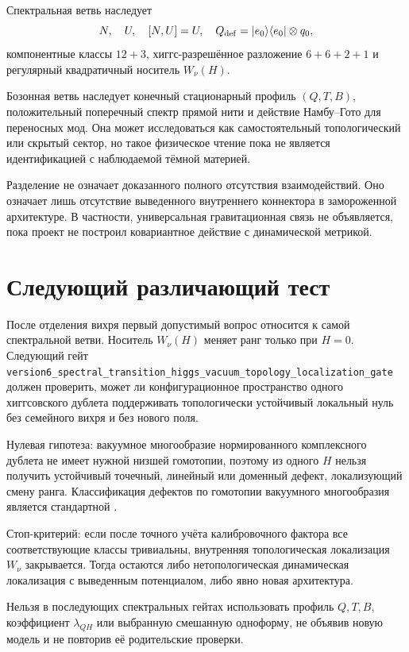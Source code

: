 Спектральная ветвь наследует
\begin{equation}
 N,\quad U,\quad [N,U]=U,\quad
 Q_{\rm def}=|e_0\rangle\langle e_0|\otimes q_0,
\end{equation}
компонентные классы $12+3$, хиггс-разрешённое разложение
$6+6+2+1$ и регулярный квадратичный носитель $W_\nu(H)$.

Бозонная ветвь наследует конечный стационарный профиль $(Q,T,B)$,
положительный поперечный спектр прямой нити и действие Намбу--Гото для
переносных мод. Она может исследоваться как самостоятельный
топологический или скрытый сектор, но такое физическое чтение пока не
является идентификацией с наблюдаемой тёмной материей.

Разделение не означает доказанного полного отсутствия взаимодействий.
Оно означает лишь отсутствие выведенного внутреннего коннектора в
замороженной архитектуре. В частности, универсальная гравитационная
связь не объявляется, пока проект не построил ковариантное действие с
динамической метрикой.

\section{Следующий различающий тест}

После отделения вихря первый допустимый вопрос относится к самой
спектральной ветви. Носитель $W_\nu(H)$ меняет ранг только при $H=0$.
Следующий гейт
\texttt{version6\_spectral\_transition\_higgs\_vacuum\_topology\_localization\_gate}
должен проверить, может ли конфигурационное пространство одного
хиггсовского дублета поддерживать топологически устойчивый локальный нуль
без семейного вихря и без нового поля.

Нулевая гипотеза: вакуумное многообразие нормированного комплексного
дублета не имеет нужной низшей гомотопии, поэтому из одного $H$ нельзя
получить устойчивый точечный, линейный или доменный дефект, локализующий
смену ранга. Классификация дефектов по гомотопии вакуумного многообразия
является стандартной \cite{mermin1979}.

Стоп-критерий: если после точного учёта калибровочного фактора все
соответствующие классы тривиальны, внутренняя топологическая локализация
$W_\nu$ закрывается. Тогда остаются либо нетопологическая динамическая
локализация с выведенным потенциалом, либо явно новая архитектура.

\begin{nogocriterion}
Нельзя в последующих спектральных гейтах использовать профиль $Q,T,B$,
коэффициент $\lambda_{QH}$ или выбранную смешанную одноформу, не объявив
новую модель и не повторив её родительские проверки.
\end{nogocriterion}

